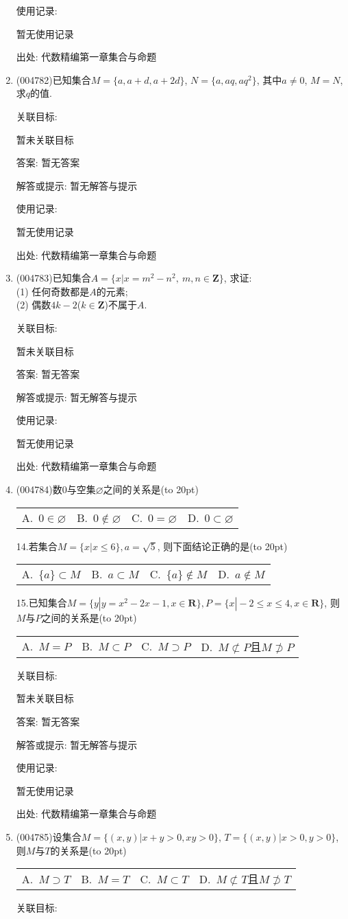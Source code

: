 \documentclass[10pt,a4paper]{article}
\newcommand{\bracket}[1]{(\hbox to #1pt{})}
\newcommand{\fourch}[4]{\par\begin{tabular}{p{.23\textwidth}p{.23\textwidth}p{.23\textwidth}p{.23\textwidth}}
A.~#1 &B.~#2& C.~#3& D.~#4
\end{tabular}}
\begin{document}
\begin{enumerate}[1.]
使用记录:

暂无使用记录


出处: 代数精编第一章集合与命题
\item { (004782)}已知集合$M=\{a,a+d,a+2d\}$, $N=\{a,aq,aq^2\}$, 其中$a\ne 0$, $M=N$, 求$q$的值.


关联目标:

暂未关联目标

答案: 暂无答案

解答或提示: 暂无解答与提示

使用记录:

暂无使用记录


出处: 代数精编第一章集合与命题
\item { (004783)}已知集合$A=\{x|x=m^2-n^2, \ m,n\in \mathbf{Z}\}$, 求证:\\
(1) 任何奇数都是$A$的元素;\\
(2) 偶数$4k-2$($k\in \mathbf{Z}$)不属于$A$.


关联目标:

暂未关联目标

答案: 暂无答案

解答或提示: 暂无解答与提示

使用记录:

暂无使用记录


出处: 代数精编第一章集合与命题
\item { (004784)}数0与空集$\varnothing$之间的关系是\bracket{20}
\fourch{$0\in \varnothing$}{$0\notin \varnothing$}{$0=\varnothing$}{$0\subset \varnothing$}14.若集合$M=\{x |x\le 6\},a=\sqrt 5$, 则下面结论正确的是\bracket{20}
\fourch{$\{ a\}\subset M$}{$a\subset M$}{$\{ a\}\notin M$}{$a\notin M$}15.已知集合$M=\{y |y=x^2-2x-1,x\in \mathbf{R}\},P=\{x |-2\le x\le 4,x\in \mathbf{R}\}$, 则$M$与$P$之间的关系是\bracket{20}
\fourch{$M=P$}{$M\subset P$}{$M\supset P$}{$M\not\subset P$且$M\not\supset P$}


关联目标:

暂未关联目标

答案: 暂无答案

解答或提示: 暂无解答与提示

使用记录:

暂无使用记录


出处: 代数精编第一章集合与命题
\item { (004785)}设集合$M=\{ (x,y)| x+y>0,xy>0 \}$, $T=\{ (x,y)| x>0,y>0 \}$, 则$M$与$T$的关系是\bracket{20}
\fourch{$M\supset T$}{$M=T$}{$M\subset T$}{$M\not\subset T$且$M\not\supset T$}


关联目标:


\end{enumerate}
\end{document}
